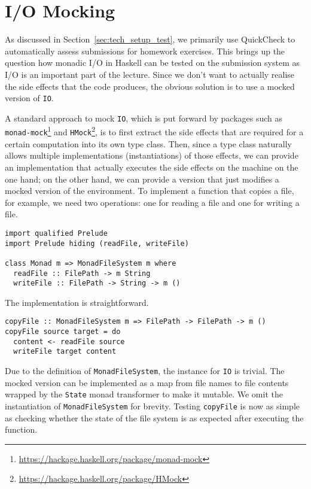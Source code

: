\section{I/O Mocking}
As discussed in Section~\ref{sec:tech_setup_test}, we primarily use QuickCheck to automatically assess submissions for homework exercises.
This brings up the question how monadic I/O in Haskell can be tested on the submission system as I/O is an important part of the lecture.
Since we don't want to actually realise the side effects that the code produces, the obvious solution is to use a mocked version of \texttt{IO}.

A standard approach to mock \texttt{IO}, which is put forward by packages such as \texttt{monad-mock}\footnote{\url{https://hackage.haskell.org/package/monad-mock}} and \texttt{HMock}\footnote{\url{https://hackage.haskell.org/package/HMock}}, is to first extract the side effects that are required for a certain computation into its own type class.
Then, since a type class naturally allows multiple implementations (instantiations) of those effects, we can provide an implementation that actually executes the side effects on the machine on the one hand; on the other hand, we can provide a version that just modifies a mocked version of the environment. 
To implement a function that copies a file, for example, we need two operations: one for reading a file and one for writing a file.
\begin{verbatim}
import qualified Prelude
import Prelude hiding (readFile, writeFile)

class Monad m => MonadFileSystem m where
  readFile :: FilePath -> m String
  writeFile :: FilePath -> String -> m ()
\end{verbatim}
The implementation is straightforward.
\begin{verbatim}
copyFile :: MonadFileSystem m => FilePath -> FilePath -> m ()
copyFile source target = do
  content <- readFile source
  writeFile target content
\end{verbatim}
Due to the definition of \texttt{MonadFileSystem}, the instance for \texttt{IO} is trivial. 
The mocked version can be implemented as a map from file names to file contents wrapped by the \texttt{State} monad transformer to make it mutable.
We omit the instantiation of \texttt{MonadFileSystem} for brevity.
Testing \texttt{copyFile} is now as simple as checking whether the state of the file system is as expected after executing the function.
